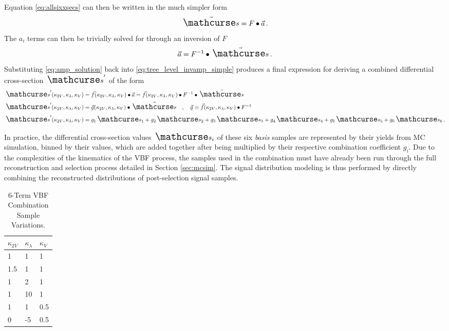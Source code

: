     Equation \ref{eq:allsixxsecs} can then be written in the much simpler form
    \begin{equation}
        \vec{\xsec} = F \bullet \vec{a}
        \,.
    \end{equation}
    The $a_i$ terms can then be trivially solved for through an inversion of $F$
    \begin{equation} \label{eq:amp_solution}
        \vec{a} = F^{-1} \bullet \vec{\xsec}
        \,.
    \end{equation}
    Substituting \ref{eq:amp_solution} back into \ref{eq:tree_level_invamp_simple} produces
        a final expression for deriving a combined differential cross-section $\xsec'$ of the form
    \begin{equation} \label{eq:combination_general} \begin{split}
        \xsec'(\kvv,\kl,\kv) &= \vec{f}(\kvv,\kl,\kv) \bullet \vec{a}
            = \vec{f}(\kvv,\kl,\kv) \bullet F^{-1} \bullet \vec{\xsec} \\
        \xsec'(\kvv,\kl,\kv) &= \vec{g}(\kvv,\kl,\kv) \bullet \vec{\xsec}
            \quad,\quad \vec{g} \equiv \vec{f}(\kvv,\kl,\kv) \bullet F^{-1} \\
        \xsec'(\kvv,\kl,\kv) &= 
            \combterm{1} +
            \combterm{2} +
            \combterm{3} +
            \combterm{4} +
            \combterm{5} +
            \combterm{6}
        \,.
    \end{split} \end{equation}

    In practice, the differential cross-section values $\xsec_i$ of these six \textit{basis} samples
        are represented by their yields from MC simulation,
        binned by their \mhh values,
        which are added together after being multiplied by their respective combination coefficient $g_i$.
    Due to the complexities of the kinematics of the VBF process,
        the samples used in the combination must have already been run through the full reconstruction and selection process detailed in Section \ref{sec:mcsim}.
    The signal distribution modeling is thus performed by directly combining the reconstructed \mhh distributions of post-selection signal samples.

    \begin{table}[] \centering
    \caption{6-Term VBF Combination Sample Variations.}
    \label{tab:vbf_hh_6term_varlist}
    \begin{tabular}{ |l|l|l| }
        \hline
        \textbf {$\kappa_{2V}$} & \textbf {$\kappa_\lambda$} & \textbf {$\kappa_V$} \\
        \hline
            1   &   1 & 1   \\
            1.5 &   1 & 1   \\
            1   &   2 & 1   \\
            1   &  10 & 1   \\
            1   &   1 & 0.5 \\
            0   &  -5 & 0.5 \\
        \hline
    \end{tabular} \end{table}

